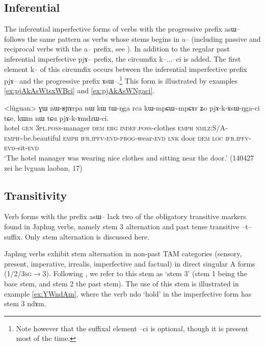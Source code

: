 \documentclass[oldfontcommands,oneside,a4paper,11pt]{article}
\newcommand{\ipa}[1]{{\phon \mbox{#1}}} %
\begin{document}
\subsection{Inferential}

The inferential imperfective forms of verbs with the progressive prefix \ipa{asɯ--} follows the same pattern as verbs whose stems begins in \ipa{a--} (including passive and reciprocal verbs with the \ipa{a--} prefix, see \citealt{jacques07passif}). In addition to the regular past inferential imperfective \ipa{pjɤ--} prefix, the circumfix \ipa{k--}...\ipa{--ci} is added. The first element \ipa{k--} of this circumfix occurs between the inferential imperfective prefix \ipa{pjɤ--} and the progressive prefix \ipa{ɤsɯ--}.\footnote{Note however that the suffixal element \ipa{--ci} is optional, though it is present most of the time.} This form is illustrated by examples \ref{ex:pjAkAsWtsxWBci} and \ref{ex:pjAkAsWNgaci}.

\begin{exe}
\ex \label{ex:pjAkAsWNgaci}
\gll
<lüguan>	\ipa{ɣɯ} 	\ipa{nɯ-ʁɲɤrpa} 	\ipa{nɯ} 	\ipa{kɯ} 	\ipa{tɯ-ŋga} 	\ipa{rca} 	\ipa{kɯ-mpɕɯ\textasciitilde{}mpɕɤr} 	\ipa{ʑo} 	\ipa{pjɤ-k-ɤsɯ-ŋga-ci} 	\ipa{tɕe,} 	\ipa{kɯm} 	\ipa{nɯ} 	\ipa{tɕu} 	\ipa{pjɤ-k-ɤmdzɯ-ci.} 	\\
hotel \textsc{gen} \textsc{3pl.poss}-manager \textsc{dem} \textsc{erg} \textsc{indef.poss}-clothes \textsc{emph} \textsc{nmlz:S/A-emph}\textasciitilde{}be.beautiful \textsc{emph} \textsc{ifr.ipfv-evd-prog}-wear-\textsc{evd} \textsc{lnk} door \textsc{dem} \textsc{loc} \textsc{ifr.ipfv-evd}-sit-\textsc{evd}
\\
\glt `The hotel manager was wearing nice clothes and sitting near the door.' (140427 zei he lvguan laoban, 17)
\end{exe}

\subsection{Transitivity}

Verb forms with the prefix \ipa{asɯ--} lack two of the obligatory transitive markers found in Japhug verbs, namely stem 3 alternation and past tense transitive \ipa{--t--} suffix. Only stem alternation is discussed here.

Japhug verbs exhibit stem alternation in non-past TAM categories (sensory, present, imperative, irrealis, imperfective and factual) in direct singular A forms (\textsc{1/2/3sg}$\rightarrow$3). Following \citet{jackson00puxi}, we refer to this stem as `stem 3' (stem 1 being the base stem, and stem 2 the past stem). The use of this stem is illustrated in example \ref{ex:YWndAm}, where the verb \ipa{ndo} `hold' in the imperfective form has stem 3 \ipa{ndɤm}.
\end{document}
